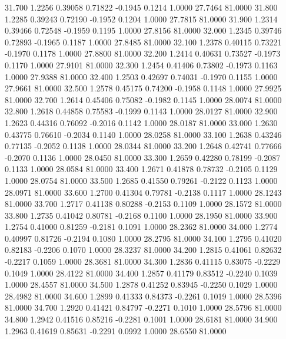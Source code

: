   31.700   1.2256   0.39058   0.71822  -0.1945   0.1214   1.0000  27.7464  81.0000
  31.800   1.2285   0.39243   0.72190  -0.1952   0.1204   1.0000  27.7815  81.0000
  31.900   1.2314   0.39466   0.72548  -0.1959   0.1195   1.0000  27.8156  81.0000
  32.000   1.2345   0.39746   0.72893  -0.1965   0.1187   1.0000  27.8485  81.0000
  32.100   1.2378   0.40115   0.73221  -0.1970   0.1178   1.0000  27.8800  81.0000
  32.200   1.2414   0.40631   0.73527  -0.1973   0.1170   1.0000  27.9101  81.0000
  32.300   1.2454   0.41406   0.73802  -0.1973   0.1163   1.0000  27.9388  81.0000
  32.400   1.2503   0.42697   0.74031  -0.1970   0.1155   1.0000  27.9661  81.0000
  32.500   1.2578   0.45175   0.74200  -0.1958   0.1148   1.0000  27.9925  81.0000
  32.700   1.2614   0.45406   0.75082  -0.1982   0.1145   1.0000  28.0074  81.0000
  32.800   1.2618   0.44858   0.75583  -0.1999   0.1143   1.0000  28.0127  81.0000
  32.900   1.2623   0.44316   0.76092  -0.2016   0.1142   1.0000  28.0187  81.0000
  33.000   1.2630   0.43775   0.76610  -0.2034   0.1140   1.0000  28.0258  81.0000
  33.100   1.2638   0.43246   0.77135  -0.2052   0.1138   1.0000  28.0344  81.0000
  33.200   1.2648   0.42741   0.77666  -0.2070   0.1136   1.0000  28.0450  81.0000
  33.300   1.2659   0.42280   0.78199  -0.2087   0.1133   1.0000  28.0584  81.0000
  33.400   1.2671   0.41878   0.78732  -0.2105   0.1129   1.0000  28.0754  81.0000
  33.500   1.2685   0.41550   0.79261  -0.2122   0.1123   1.0000  28.0971  81.0000
  33.600   1.2700   0.41304   0.79781  -0.2138   0.1117   1.0000  28.1243  81.0000
  33.700   1.2717   0.41138   0.80288  -0.2153   0.1109   1.0000  28.1572  81.0000
  33.800   1.2735   0.41042   0.80781  -0.2168   0.1100   1.0000  28.1950  81.0000
  33.900   1.2754   0.41000   0.81259  -0.2181   0.1091   1.0000  28.2362  81.0000
  34.000   1.2774   0.40997   0.81726  -0.2194   0.1080   1.0000  28.2795  81.0000
  34.100   1.2795   0.41020   0.82183  -0.2206   0.1070   1.0000  28.3237  81.0000
  34.200   1.2815   0.41061   0.82632  -0.2217   0.1059   1.0000  28.3681  81.0000
  34.300   1.2836   0.41115   0.83075  -0.2229   0.1049   1.0000  28.4122  81.0000
  34.400   1.2857   0.41179   0.83512  -0.2240   0.1039   1.0000  28.4557  81.0000
  34.500   1.2878   0.41252   0.83945  -0.2250   0.1029   1.0000  28.4982  81.0000
  34.600   1.2899   0.41333   0.84373  -0.2261   0.1019   1.0000  28.5396  81.0000
  34.700   1.2920   0.41421   0.84797  -0.2271   0.1010   1.0000  28.5796  81.0000
  34.800   1.2942   0.41516   0.85216  -0.2281   0.1001   1.0000  28.6181  81.0000
  34.900   1.2963   0.41619   0.85631  -0.2291   0.0992   1.0000  28.6550  81.0000
